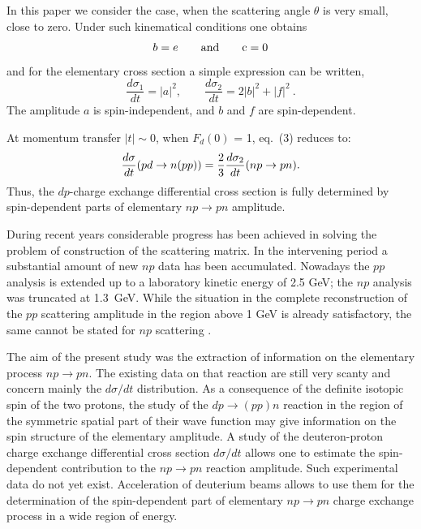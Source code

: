 \documentclass[epj]{svjour}
\begin{document}
In this paper we consider the case, when the scattering angle $\theta$ is very
small, close to zero. Under such kinematical conditions one obtains
\begin{equation}
  b=e \qquad \rm{and} \qquad c=0
\end{equation}
and for the elementary cross section a simple expression can be written,
\begin{equation}
  \frac{d\sigma _1}{dt}=|a|^2, \qquad
  \frac{d\sigma _2}{dt}=2|b|^2+|f|^2\ .
\end{equation}
The amplitude $a$ is spin-independent, and $b$ and $f$ are spin-dependent.

At momentum transfer $\vert t \vert\sim 0$, when $F_d (0)$ = 1, eq.~(3) reduces
to:
\begin{equation}
  \frac{d\sigma }{dt}(pd\rightarrow n(pp))=\frac 23\frac{d\sigma _2}{%
    dt}(np\rightarrow pn).
\end{equation}
Thus, the $dp$-charge exchange differential cross section is fully determined by
spin-dependent parts of elementary $np\to pn$ amplitude.

During recent years considerable progress has been achieved in solving the
problem of construction of the scattering matrix. In the intervening period a
substantial amount of new $np$ data has been accumulated. Nowadays the $pp$
analysis is extended up to a laboratory kinetic energy of 2.5 GeV; the $np$
analysis was truncated at 1.3~GeV. While the situation in the complete
reconstruction of the $pp$ scattering amplitude in the region above 1 GeV is
already satisfactory, the same cannot be stated for $np$ scattering \cite{Arn}.

The aim of the present study was the extraction of information on the elementary
process $np\to pn$. The existing data on that reaction are still very scanty and
concern mainly the $d\sigma/dt$ distribution. As a consequence of the definite
isotopic spin of the two protons, the study of the $dp\to (pp)n$ reaction in the
region of the symmetric spatial part of their wave function may give information
on the spin structure of the elementary amplitude. A study of the
deuteron-proton charge exchange differential cross section $d\sigma/dt$ allows
one to estimate the spin-dependent contribution to the $np\to pn$ reaction
amplitude. Such experimental data do not yet exist. Acceleration of deuterium
beams allows to use them for the determination of the spin-dependent part of
elementary $np\to pn$ charge exchange process in a wide region of energy.
\end{document}
